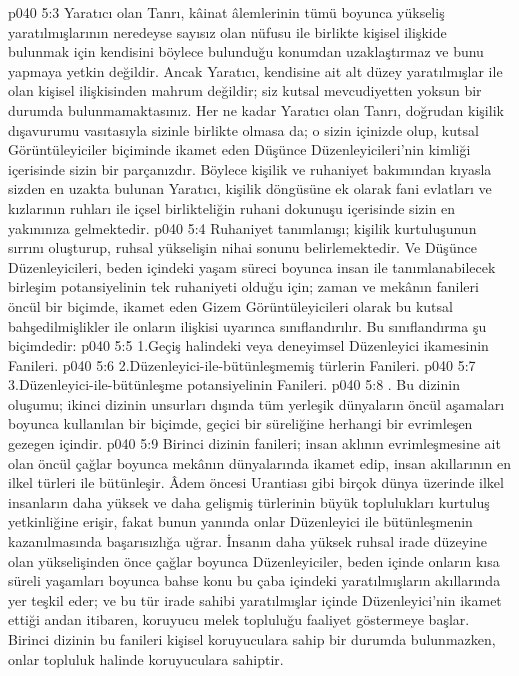 \vs p040 5:3 Yaratıcı olan Tanrı, kâinat âlemlerinin tümü boyunca yükseliş yaratılmışlarının neredeyse sayısız olan nüfusu ile birlikte kişisel ilişkide bulunmak için kendisini böylece bulunduğu konumdan uzaklaştırmaz ve bunu yapmaya yetkin değildir. Ancak Yaratıcı, kendisine ait alt düzey yaratılmışlar ile olan kişisel ilişkisinden mahrum değildir; siz kutsal mevcudiyetten yoksun bir durumda bulunmamaktasınız. Her ne kadar Yaratıcı olan Tanrı, doğrudan kişilik dışavurumu vasıtasıyla sizinle birlikte olmasa da; o sizin içinizde olup, kutsal Görüntüleyiciler biçiminde ikamet eden Düşünce Düzenleyicileri’nin kimliği içerisinde sizin bir parçanızdır. Böylece kişilik ve ruhaniyet bakımından kıyasla sizden en uzakta bulunan Yaratıcı, kişilik döngüsüne ek olarak fani evlatları ve kızlarının ruhları ile içsel birlikteliğin ruhani dokunuşu içerisinde sizin en yakınınıza gelmektedir.
\vs p040 5:4 Ruhaniyet tanımlanışı; kişilik kurtuluşunun sırrını oluşturup, ruhsal yükselişin nihai sonunu belirlemektedir. Ve Düşünce Düzenleyicileri, beden içindeki yaşam süreci boyunca insan ile tanımlanabilecek birleşim potansiyelinin tek ruhaniyeti olduğu için; zaman ve mekânın fanileri öncül bir biçimde, ikamet eden Gizem Görüntüleyicileri olarak bu kutsal bahşedilmişlikler ile onların ilişkisi uyarınca sınıflandırılır. Bu sınıflandırma şu biçimdedir:
\vs p040 5:5 1.\bibnobreakspace Geçiş halindeki veya deneyimsel Düzenleyici ikamesinin Fanileri.
\vs p040 5:6 2.\bibnobreakspace Düzenleyici\hyp{}ile\hyp{}bütünleşmemiş türlerin Fanileri.
\vs p040 5:7 3.\bibnobreakspace Düzenleyici\hyp{}ile\hyp{}bütünleşme potansiyelinin Fanileri.
\vs p040 5:8 . Bu dizinin oluşumu; ikinci dizinin unsurları dışında tüm yerleşik dünyaların öncül aşamaları boyunca kullanılan bir biçimde, geçici bir süreliğine herhangi bir evrimleşen gezegen içindir.
\vs p040 5:9 Birinci dizinin fanileri; insan aklının evrimleşmesine ait olan öncül çağlar boyunca mekânın dünyalarında ikamet edip, insan akıllarının en ilkel türleri ile bütünleşir. Âdem öncesi Urantiası gibi birçok dünya üzerinde ilkel insanların daha yüksek ve daha gelişmiş türlerinin büyük toplulukları kurtuluş yetkinliğine erişir, fakat bunun yanında onlar Düzenleyici ile bütünleşmenin kazanılmasında başarısızlığa uğrar. İnsanın daha yüksek ruhsal irade düzeyine olan yükselişinden önce çağlar boyunca Düzenleyiciler, beden içinde onların kısa süreli yaşamları boyunca bahse konu bu çaba içindeki yaratılmışların akıllarında yer teşkil eder; ve bu tür irade sahibi yaratılmışlar içinde Düzenleyici’nin ikamet ettiği andan itibaren, koruyucu melek topluluğu faaliyet göstermeye başlar. Birinci dizinin bu fanileri kişisel koruyuculara sahip bir durumda bulunmazken, onlar topluluk halinde koruyuculara sahiptir.

